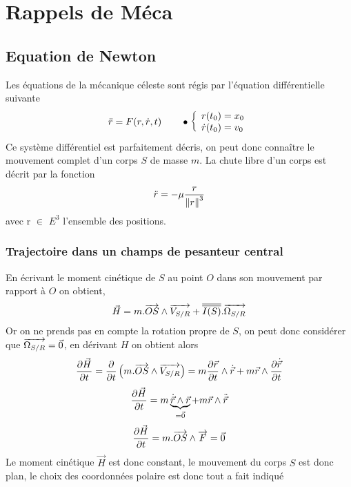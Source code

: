 \chapter*{Rappels de Méca}
\section*{Equation de Newton}
Les équations de la mécanique céleste sont régis par l'équation différentielle suivante
\begin{equation}
    \ddot{r} = F(r,\dot{r},t) \qquad \bullet \left\{ \begin{array}{l} r(t_0) = x_0 \\ \dot{r}(t_0) = v_0  \end{array} \right.
\end{equation}
Ce système différentiel est parfaitement décris, on peut donc connaître le mouvement complet d'un corps $S$ de masse $m$. La chute libre d'un corps est décrit par la fonction
\begin{equation}
    \ddot{r} = - \mu \dfrac{r}{\left\Vert r \right\Vert^3}
\end{equation}
avec r $\in$ $E^3$ l'ensemble des positions.
\subsection*{Trajectoire dans un champs de pesanteur central}
En écrivant le moment cinétique de $S$ au point $O$ dans son mouvement par rapport à $O$ on obtient,
\begin{equation}
    \vec H = m . \overrightarrow{OS} \wedge \overrightarrow{V_{S/R}} + \overline{\overline{I(S)}}.\overrightarrow{\Omega_{S/R}}
\end{equation}
Or on ne prends pas en compte la rotation propre de $S$, on peut donc considérer que $\overrightarrow{\Omega_{S/R}} = \vec 0$, en dérivant $H$ on obtient alors
\begin{equation}
    \dfrac{\partial \vec H}{\partial t} = \dfrac{\partial }{\partial t}\left(m . \overrightarrow{OS} \wedge \overrightarrow{V_{S/R}}\right)= m \dfrac{\partial \vec r}{\partial t} \wedge \dot{\vec r} + m \vec r \wedge \dfrac{\partial \dot{\vec r}}{\partial t}
\end{equation}
$$
\dfrac{\partial \vec H}{\partial t} = m \underbrace{\dot{\vec r} \wedge {\vec r}}_{=\vec 0} + m \vec r \wedge \ddot{\vec r}
$$
\begin{equation}
    \dfrac{\partial \vec H}{\partial t} = m . \overrightarrow{OS} \wedge \overrightarrow{F} = \vec 0
\end{equation}
Le moment cinétique $\vec H$ est donc constant, le mouvement du corps $S$ est donc plan, le choix des coordonnées polaire est donc tout a fait indiqué